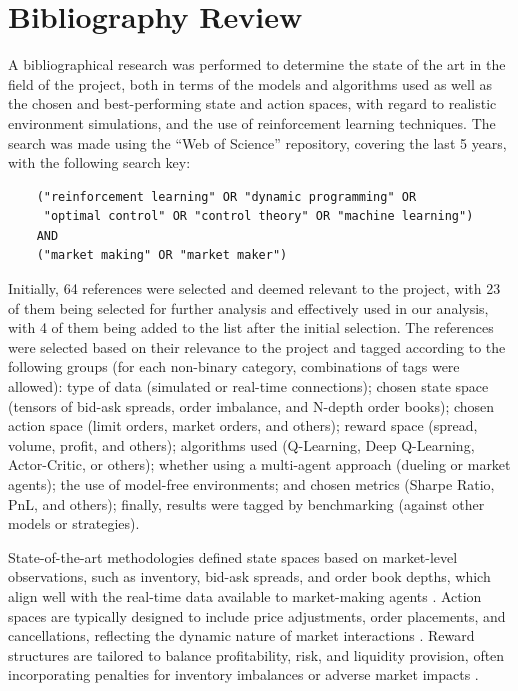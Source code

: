 \section{Bibliography Review}
\label{sec:bibliography-review}

A bibliographical research was performed to determine the state of the art in the field of the project, both in terms of the models and algorithms used as well as the chosen and best-performing state and action spaces, with regard to realistic environment simulations, and the use of reinforcement learning techniques. The search was made using the “Web of Science” repository, covering the last 5 years, with the following search key:

\begin{verbatim}
    ("reinforcement learning" OR "dynamic programming" OR
     "optimal control" OR "control theory" OR "machine learning")
    AND
    ("market making" OR "market maker")
\end{verbatim}

Initially, 64 references were selected and deemed relevant to the project, with 23 of them being selected for further analysis and effectively used in our analysis,
with 4 of them being added to the list after the initial selection.
The references were selected based on their relevance to the project and tagged according to the following groups (for each non-binary category, combinations of tags were allowed):
type of data (simulated or real-time connections);
chosen state space (tensors of bid-ask spreads, order imbalance, and N-depth order books);
chosen action space (limit orders, market orders, and others); reward space (spread, volume, profit, and others);
algorithms used (Q-Learning, Deep Q-Learning, Actor-Critic, or others); whether using a multi-agent approach (dueling or market agents);
the use of model-free environments; and chosen metrics (Sharpe Ratio, PnL, and others);
finally, results were tagged by benchmarking (against other models or strategies).

State-of-the-art methodologies defined state spaces based on market-level observations, such as inventory, bid-ask spreads, and order book depths,
which align well with the real-time data available to market-making agents \cite{he2023integrating, bakshaev2020marketmaking}.
Action spaces are typically designed to include price adjustments, order placements, and cancellations,
reflecting the dynamic nature of market interactions \cite{sun2020marketmaking, gasperov2021marketmaking}.
Reward structures are tailored to balance profitability, risk, and liquidity provision,
often incorporating penalties for inventory imbalances or adverse market impacts \cite{sun2020marketmaking, gasperov2021marketmaking}.

